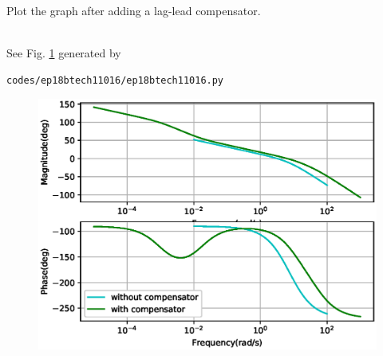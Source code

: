 
Plot the graph after adding a lag-lead compensator.

\solution\\
See Fig. \ref{fig:ep18btech11016_bode} generated by 
\begin{lstlisting}
codes/ep18btech11016/ep18btech11016.py
\end{lstlisting}

\begin{figure}[ht!]
    \centering
    \includegraphics[width=\columnwidth]{./figs/ep18btech11016/ep18btech11016_fig3.eps}
    \caption{}
    \label{fig:ep18btech11016_bode}
\end{figure}

